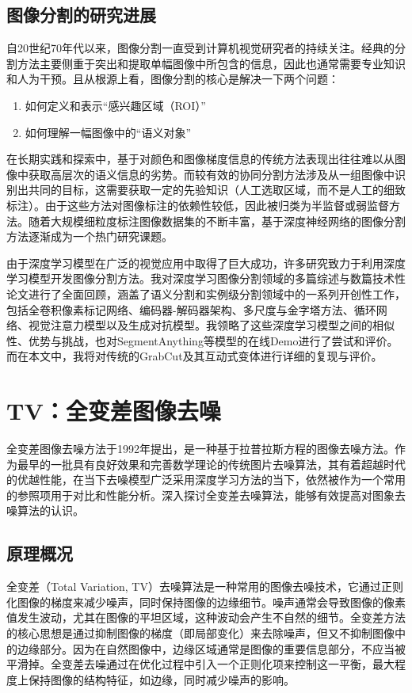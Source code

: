 \documentclass[UTF8]{ctexart}
\begin{document}
\subsection{图像分割的研究进展}
自20世纪70年代以来，图像分割一直受到计算机视觉研究者的持续关注。经典的分割方法主要侧重于突出和提取单幅图像中所包含的信息，因此也通常需要专业知识和人为干预。且从根源上看，图像分割的核心是解决一下两个问题\cite{yu_techniques_2023}：
\begin{enumerate}
  \item 如何定义和表示“感兴趣区域（ROI）”
  \item 如何理解一幅图像中的“语义对象”
\end{enumerate}\par
在长期实践和探索中，基于对颜色和图像梯度信息的传统方法表现出往往难以从图像中获取高层次的语义信息的劣势。而较有效的协同分割方法涉及从一组图像中识别出共同的目标，这需要获取一定的先验知识（人工选取区域，而不是人工的细致标注）。由于这些方法对图像标注的依赖性较低，因此被归类为半监督或弱监督方法。随着大规模细粒度标注图像数据集的不断丰富，基于深度神经网络的图像分割方法逐渐成为一个热门研究课题。\par
由于深度学习模型在广泛的视觉应用中取得了巨大成功，许多研究致力于利用深度学习模型开发图像分割方法。\cite{minaee_image_2022}我对深度学习图像分割领域的多篇综述与数篇技术性论文进行了全面回顾，涵盖了语义分割和实例级分割领域中的一系列开创性工作，包括全卷积像素标记网络、编码器-解码器架构、多尺度与金字塔方法、循环网络、视觉注意力模型以及生成对抗模型。我领略了这些深度学习模型之间的相似性、优势与挑战，也对SegmentAnything等模型的在线Demo进行了尝试和评价。而在本文中，我将对传统的GrabCut及其互动式变体进行详细的复现与评价。

\section{TV：全变差图像去噪}
全变差图像去噪方法于1992年提出\cite{rudin_nonlinear_1992}，是一种基于拉普拉斯方程的图像去噪方法。作为最早的一批具有良好效果和完善数学理论的传统图片去噪算法，其有着超越时代的优越性能，在当下去噪模型广泛采用深度学习方法的当下，依然被作为一个常用的参照项用于对比和性能分析。深入探讨全变差去噪算法，能够有效提高对图象去噪算法的认识。
\subsection{原理概况}
全变差（Total Variation, TV）去噪算法是一种常用的图像去噪技术，它通过正则化图像的梯度来减少噪声，同时保持图像的边缘细节。噪声通常会导致图像的像素值发生波动，尤其在图像的平坦区域，这种波动会产生不自然的细节。全变差方法的核心思想是通过抑制图像的梯度（即局部变化）来去除噪声，但又不抑制图像中的边缘部分。因为在自然图像中，边缘区域通常是图像的重要信息部分，不应当被平滑掉。全变差去噪通过在优化过程中引入一个正则化项来控制这一平衡，最大程度上保持图像的结构特征，如边缘，同时减少噪声的影响。
\end{document}
